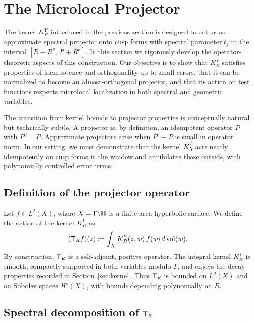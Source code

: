 \section{The Microlocal Projector}\label{sec:projector}

The kernel $K_R^Y$ introduced in the previous section is designed to act as an approximate spectral projector onto cusp forms with spectral parameter $t_j$ in the interval $[R-R^\theta,\,R+R^\theta]$. In this section we rigorously develop the operator-theoretic aspects of this construction. Our objective is to show that $K_R^Y$ satisfies properties of idempotence and orthogonality up to small errors, that it can be normalized to become an almost-orthogonal projector, and that its action on test functions respects microlocal localization in both spectral and geometric variables.

The transition from kernel bounds to projector properties is conceptually natural but technically subtle. A projector is, by definition, an idempotent operator $P$ with $P^2=P$. Approximate projectors arise when $P^2-P$ is small in operator norm. In our setting, we must demonstrate that the kernel $K_R^Y$ acts nearly idempotently on cusp forms in the window and annihilates those outside, with polynomially controlled error terms.

\subsection{Definition of the projector operator}\label{subsec:proj-def}

Let $f\in L^2(X)$, where $X=\Gamma\backslash\mathbb{H}$ is a finite-area hyperbolic surface. We define the action of the kernel $K_R^Y$ as
\[
(\mathsf{T}_R f)(z) := \int_X K_R^Y(z,w)\,f(w)\,d\operatorname{vol}(w).
\]
By construction, $\mathsf{T}_R$ is a self-adjoint, positive operator. The integral kernel $K_R^Y$ is smooth, compactly supported in both variables modulo $\Gamma$, and enjoys the decay properties recorded in Section~\ref{sec:kernel}. Thus $\mathsf{T}_R$ is bounded on $L^2(X)$ and on Sobolev spaces $H^s(X)$, with bounds depending polynomially on $R$.

\subsection{Spectral decomposition of $\mathsf{T}_R$}\label{subsec:proj-spectrum}
